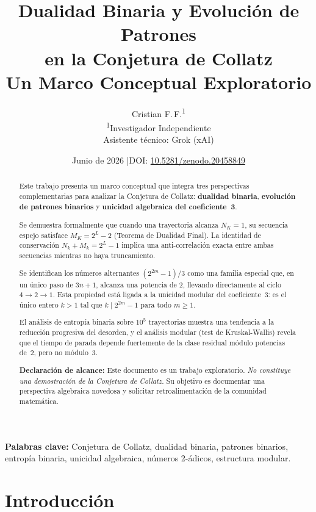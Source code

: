 \documentclass[11pt,a4paper]{article}
\title{%
  \textbf{Dualidad Binaria y Evolución de Patrones\\
  en la Conjetura de Collatz}\\[0.4em]
  {\large Un Marco Conceptual Exploratorio}
}
\author{%
  Cristian F.\,F.\textsuperscript{1} \\[0.3em]
  \textsuperscript{1}Investigador Independiente \\[0.2em]
  \small Asistente técnico: Grok (xAI)
}
\date{Junio de 2026 \quad|\quad DOI: \href{https://doi.org/10.5281/zenodo.20458849}{10.5281/zenodo.20458849}}
\begin{document}
\maketitle

\begin{abstract}
Este trabajo presenta un marco conceptual que integra tres perspectivas
complementarias para analizar la Conjetura de Collatz:
\textbf{dualidad binaria}, \textbf{evolución de patrones binarios}
y \textbf{unicidad algebraica del coeficiente~3}.

Se demuestra formalmente que cuando una trayectoria alcanza $N_K = 1$,
su secuencia espejo satisface $M_K = 2^L - 2$ (Teorema de Dualidad Final).
La identidad de conservación $N_k + M_k = 2^L - 1$ implica una
anti-correlación exacta entre ambas secuencias mientras no haya truncamiento.

Se identifican los números alternantes $(2^{2m}-1)/3$ como una familia
especial que, en un único paso de $3n+1$, alcanza una potencia de $2$,
llevando directamente al ciclo $4{\to}2{\to}1$.
Esta propiedad está ligada a la unicidad modular del coeficiente~$3$:
es el único entero $k>1$ tal que $k \mid 2^{2m}-1$ para todo $m\ge1$.

El análisis de entropía binaria sobre $10^5$ trayectorias muestra una
tendencia a la reducción progresiva del desorden, y el análisis modular
(test de Kruskal-Wallis) revela que el tiempo de parada depende
fuertemente de la clase residual módulo potencias de~$2$,
pero no módulo~$3$.

\medskip
\noindent\textbf{Declaración de alcance:}
Este documento es un trabajo exploratorio. \emph{No constituye una
demostración de la Conjetura de Collatz.} Su objetivo es documentar
una perspectiva algebraica novedosa y solicitar retroalimentación
de la comunidad matemática.
\end{abstract}

\medskip
\noindent\textbf{Palabras clave:}
Conjetura de Collatz, dualidad binaria, patrones binarios,
entropía binaria, unicidad algebraica, números 2-ádicos,
estructura modular.

\section{Introducción}
\label{sec:intro}
\end{document}
